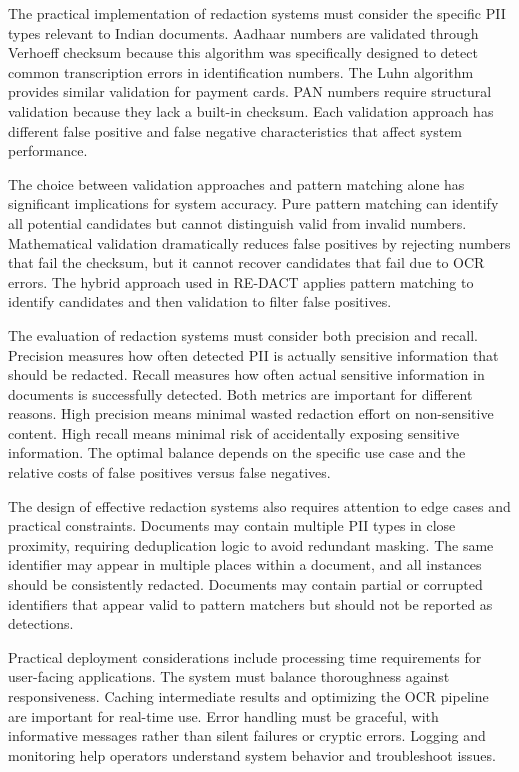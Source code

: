 \bigskip

The practical implementation of redaction systems must consider the specific PII types relevant to Indian documents. Aadhaar numbers are validated through Verhoeff checksum because this algorithm was specifically designed to detect common transcription errors in identification numbers. The Luhn algorithm provides similar validation for payment cards. PAN numbers require structural validation because they lack a built-in checksum. Each validation approach has different false positive and false negative characteristics that affect system performance.

The choice between validation approaches and pattern matching alone has significant implications for system accuracy. Pure pattern matching can identify all potential candidates but cannot distinguish valid from invalid numbers. Mathematical validation dramatically reduces false positives by rejecting numbers that fail the checksum, but it cannot recover candidates that fail due to OCR errors. The hybrid approach used in RE-DACT applies pattern matching to identify candidates and then validation to filter false positives.

The evaluation of redaction systems must consider both precision and recall. Precision measures how often detected PII is actually sensitive information that should be redacted. Recall measures how often actual sensitive information in documents is successfully detected. Both metrics are important for different reasons. High precision means minimal wasted redaction effort on non-sensitive content. High recall means minimal risk of accidentally exposing sensitive information. The optimal balance depends on the specific use case and the relative costs of false positives versus false negatives.

The design of effective redaction systems also requires attention to edge cases and practical constraints. Documents may contain multiple PII types in close proximity, requiring deduplication logic to avoid redundant masking. The same identifier may appear in multiple places within a document, and all instances should be consistently redacted. Documents may contain partial or corrupted identifiers that appear valid to pattern matchers but should not be reported as detections.

\bigskip

Practical deployment considerations include processing time requirements for user-facing applications. The system must balance thoroughness against responsiveness. Caching intermediate results and optimizing the OCR pipeline are important for real-time use. Error handling must be graceful, with informative messages rather than silent failures or cryptic errors. Logging and monitoring help operators understand system behavior and troubleshoot issues.

